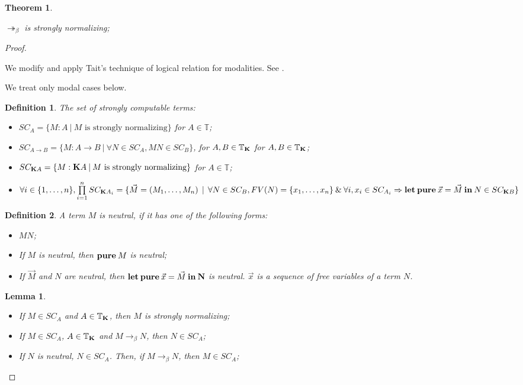 \documentclass[a4paper]{article}
\newtheorem{theorem}{Theorem}
\newtheorem{lemma}{Lemma}
\newtheorem{defin}{Definition}
\begin{document}
\begin{theorem}
  $ $

  $\twoheadrightarrow_{\beta}$ is strongly normalizing;
\end{theorem}

\begin{proof}
  $ $

We modify and apply Tait's technique of logical relation for modalities. See \cite{Pierce} \cite{Troelstra}.

We treat only modal cases below.

\begin{defin} The set of strongly computable terms:
  \begin{itemize}
    \item $SC_A = \{ M : A \: | \: M \text{ is strongly normalizing} \}$ for $A \in \mathbb{T}$;
    \item $SC_{A \to B} = \{ M : A \to B \: | \: \forall N \in SC_A, M N \in SC_B \}$, for $A,B \in \mathbb{T}_{\bf K}$ for $A, B \in \mathbb{T}_{{\bf K}}$;
    \item $SC_{{\bf K}A} = \{ M : {\bf K}A \: | \: M \text{ is strongly normalizing} \}$ for $A \in \mathbb{T}$;
    \item $\forall i \in \{ 1,\dots,n\}, \prod \limits_{i = 1}^{n} SC_{{\bf K}A_i} = \{ \vec{M} = (M_1,\dots,M_n) \:\: | \:\: \forall N \in SC_{B}, FV(N) = \{ x_1,\dots,x_n\} \: \& \: \forall i, x_i \in SC_{A_i} \Rightarrow {\bf let \: pure \:} \vec{x} = \vec{M} {\: \bf in \:} N \in SC_{{\bf K} B}\}$
  \end{itemize}
\end{defin}

\begin{defin}
  A term $M$ is neutral, if it has one of the following forms:
  \begin{itemize}
    \item $M N$;
    \item If $M$ is neutral, then ${\bf pure \:} M$ is neutral;
    \item If $\vec{M}$ and $N$ are neutral, then ${\bf let \: pure \:} \vec{x} = \vec{M} {\: \bf in \: N}$ is neutral.
    $\vec{x}$ is a sequence of free variables of a term $N$.
  \end{itemize}
\end{defin}

\begin{lemma}
  $ $

\begin{itemize}
\item If $M \in SC_A$ and $A \in \mathbb{T}_{{\bf K}}$, then $M$ is strongly normalizing;
\item If $M \in SC_A$, $A \in \mathbb{T}_{{\bf K}}$ and $M \rightarrow_{\beta} N$, then $N \in SC_A$;
\item If $N$ is neutral, $N \in SC_A$. Then, if $M \rightarrow_{\beta} N$, then $M \in SC_A$;
\end{itemize}
\end{lemma}


\end{proof}
\end{document}
